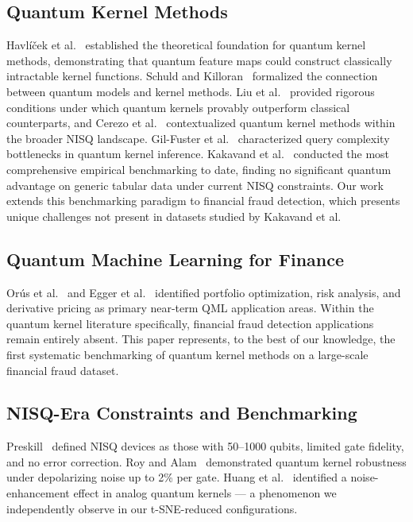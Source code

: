 \documentclass[journal]{IEEEtran}
\begin{document}
\subsection{Quantum Kernel Methods}
Havl\'{i}\v{c}ek et al.~\cite{havlicek2019} established the 
theoretical foundation for quantum kernel methods, demonstrating 
that quantum feature maps could construct classically intractable 
kernel functions. Schuld and Killoran~\cite{schuld2019} formalized 
the connection between quantum models and kernel methods. Liu 
et al.~\cite{liu2021} provided rigorous conditions under which 
quantum kernels provably outperform classical counterparts, and 
Cerezo et al.~\cite{cerezo2021} contextualized quantum kernel 
methods within the broader NISQ landscape. Gil-Fuster 
et al.~\cite{gilfuster2026} characterized query complexity 
bottlenecks in quantum kernel inference. Kakavand 
et al.~\cite{kakavand2026} conducted the most comprehensive 
empirical benchmarking to date, finding no significant quantum 
advantage on generic tabular data under current NISQ constraints. 
Our work extends this benchmarking paradigm to financial fraud 
detection, which presents unique challenges not present in 
datasets studied by Kakavand et al.

\subsection{Quantum Machine Learning for Finance}
Or\'{u}s et al.~\cite{orus2019} and Egger et al.~\cite{egger2020} 
identified portfolio optimization, risk analysis, and derivative 
pricing as primary near-term QML application areas. Within the 
quantum kernel literature specifically, financial fraud detection 
applications remain entirely absent. This paper represents, 
to the best of our knowledge, the first systematic benchmarking 
of quantum kernel methods on a large-scale financial fraud dataset.

\subsection{NISQ-Era Constraints and Benchmarking}
Preskill~\cite{preskill2018} defined NISQ devices as those 
with 50--1000 qubits, limited gate fidelity, and no error 
correction. Roy and Alam~\cite{roy2026} demonstrated quantum 
kernel robustness under depolarizing noise up to 2\% per gate. 
Huang et al.~\cite{huang2026} identified a noise-enhancement 
effect in analog quantum kernels --- a phenomenon we independently 
observe in our t-SNE-reduced configurations.
\end{document}
